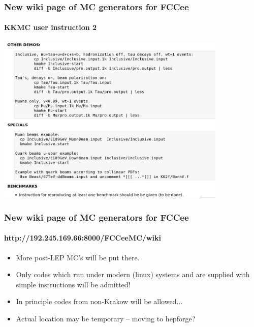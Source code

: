 \documentclass{beamer}
\begin{document}
\begin{frame}[fragile]
\frametitle{\bf New wiki page of MC generators for FCCee}
\framesubtitle{\bf KKMC user instruction 2}

\vspace{-3mm}
\includegraphics[width=110mm]{./wiki3k.jpg}

\end{frame}

\begin{frame}[fragile]
\frametitle{\bf New wiki page of MC generators for FCCee}
\framesubtitle{\bf http://192.245.169.66:8000/FCCeeMC/wiki}

\begin{itemize}
\item
 More post-LEP MC's will be put there.
\item 
 Only codes which run under modern (linux) systems
 and are supplied with simple instructions
 will be admitted!
\item
 In principle codes from non-Krakow will be allowed...
\item
 Actual location may be temporary -- moving to hepforge?
\end{itemize}
\end{frame}
\end{document}
